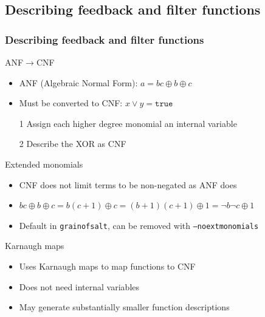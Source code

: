 \documentclass[xcolor=usenames,xcolor=svgnames,table,slidestop,compress,mathserif]{beamer}
\begin{document}
\subsection{Describing feedback and filter functions}
\frame
{\frametitle{Describing feedback and filter functions}
\begin{beamerboxesrounded}[shadow=true]{ANF$\rightarrow$CNF}
\begin{itemize}
 \item ANF (Algebraic Normal Form): $a = bc \oplus b \oplus c$
 \item Must be converted to CNF: $x \vee y = \texttt{true}$
 \item[1] Assign each higher degree monomial an internal variable
 \item[2] Describe the XOR as CNF
\end{itemize}
\end{beamerboxesrounded}

\begin{beamerboxesrounded}[shadow=true]{Extended monomials}
\begin{itemize}
 \item CNF does not limit terms to be non-negated as ANF does
 \item $bc\oplus b \oplus c= b(c+1) \oplus c= (b+1)(c+1)\oplus 1 = \neg b \neg c \oplus 1$
 \item Default in \texttt{grainofsalt}, can be removed with \texttt{--noextmonomials}
\end{itemize}
\end{beamerboxesrounded}

\begin{beamerboxesrounded}[shadow=true]{Karnaugh maps}
\begin{itemize}
 \item Uses Karnaugh maps to map functions to CNF
 \item Does not need internal variables
 \item May generate substantially smaller function descriptions
\end{itemize}

\end{beamerboxesrounded}

}
\end{document}
